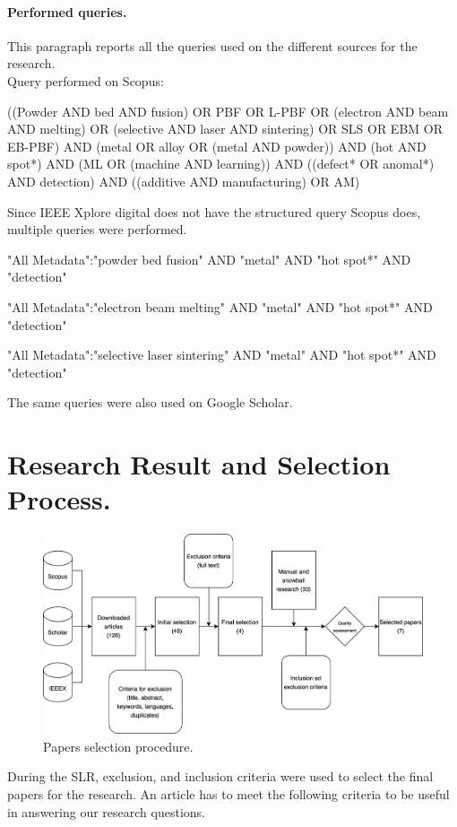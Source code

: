 \paragraph{Performed queries.} This paragraph reports all the queries used on the different sources for the research. \\[1.5ex]
Query performed on Scopus:
\begin{tcolorbox}
\footnotesize
((Powder AND bed AND fusion) OR PBF OR L-PBF OR (electron AND beam AND melting) OR (selective AND laser AND sintering) OR SLS OR EBM OR EB-PBF) AND (metal OR alloy OR (metal AND powder)) AND  (hot AND spot*) AND (ML OR (machine AND learning)) AND ((defect* OR anomal*) AND detection) AND ((additive AND manufacturing) OR AM)
\end{tcolorbox}
Since IEEE Xplore digital does not have the structured query Scopus does, multiple queries were performed.
\begin{tcolorbox}
\footnotesize
"All Metadata":"powder bed fusion" AND "metal" AND "hot spot*" AND "detection"
\end{tcolorbox}
\begin{tcolorbox}
\footnotesize
"All Metadata":"electron beam melting" AND "metal" AND "hot spot*" AND "detection"
\end{tcolorbox}
\begin{tcolorbox}
\footnotesize
"All Metadata":"selective laser sintering" AND "metal" AND "hot spot*" AND "detection"
\end{tcolorbox}
The same queries were also used on Google Scholar.

\section{Research Result and Selection Process.}
\label{sec:resresults}
\begin{figure}
    \centering
    \includegraphics[scale=0.1]{Images/selezioncina.png}
    \caption[Papers selection procedure.] {Papers selection procedure.}
    \label{fig:selezioncina}
\end{figure}
During the SLR, exclusion, and inclusion criteria were used to select the final papers for the research. An article has to meet the following criteria to be useful in answering our research questions.
